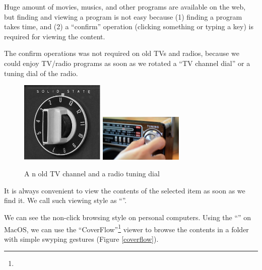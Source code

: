 \documentclass{article}
\begin{document}
% 

Huge amount of movies, musics, and other programs are available on the web, but
finding and viewing a program is not easy because
(1) finding a program takes time, and
(2) a ``confirm'' operation (clicking something or typing a key)
is required for viewing the content.


The confirm operations was not required on old TVs and radios,
because we could enjoy TV/radio programs
as soon as we rotated a ``TV channel dial'' or a tuning dial of the radio.

\begin{figure} %
\centerline{
   \includegraphics[width=40mm,bb=0 0 279 272]{figures/9bd96506bdaac48b26c5cd192851c11d.png}
   \includegraphics[width=40mm,bb=0 0 128 72]{figures/fedc4f3c899c48b5a3ddd0982801c79d.png}
}
\caption{A n old TV channel and a radio tuning dial}
\label{TV channel}
\end{figure}



It is always convenient to view the contents of the selected item
as soon as we find it.
We call such viewing style as ``''.

We can see the non-click browsing style on personal computers.
Using the ``'' on MacOS, we can use the ``CoverFlow''\footnote{
} viewer to browse the contents in a folder
with simple swyping gestures (Figure \ref{coverflow}).
\end{document}
